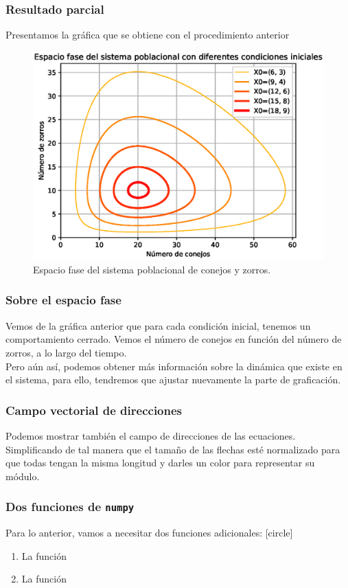 \begin{frame}
\frametitle{Resultado parcial}
\fontsize{12}{12}\selectfont
Presentamos la gráfica que se obtiene con el procedimiento anterior
\begin{figure}[h!]
    \centering
    \includegraphics[scale=0.4]{Imagenes/ejercicio_odeint_05_sistema_lotka-volterra_02.eps}
    \caption{Espacio fase del sistema poblacional de conejos y zorros.}
\end{figure}
\end{frame}
\begin{frame}
\frametitle{Sobre el espacio fase}
Vemos de la gráfica anterior que para cada condición inicial, tenemos un comportamiento cerrado. Vemos el número de conejos en función del número de zorros, a lo largo del tiempo.
\\
\bigskip
Pero aún así, podemos obtener más información sobre la dinámica que existe en el sistema, para ello, tendremos que ajustar nuevamente la parte de graficación.
\end{frame}
\begin{frame}
\frametitle{Campo vectorial de direcciones}
Podemos mostrar también el campo de direcciones de las ecuaciones.
\\
\bigskip
Simplificando de tal manera que el tamaño de las flechas esté normalizado para que todas tengan la misma longitud y darles un color para representar su módulo.
\end{frame}
\begin{frame}
\frametitle{Dos funciones de \texttt{numpy}}
Para lo anterior, vamos a necesitar dos funciones adicionales:
[circle]
\begin{enumerate}[<+->]
\item La función 
\item La función 
\end{enumerate}
\end{frame}
